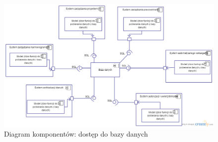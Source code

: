 \begin{figure}[h]
    \centering
    \includegraphics[scale=0.4]{diagramy/sekwencji_i_komponentow/diag_kom_dane_dostep.png}
    \caption{Diagram komponentów: dostęp do bazy danych}
    \label{fig:diag_kom_dane_dostep}
\end{figure} 